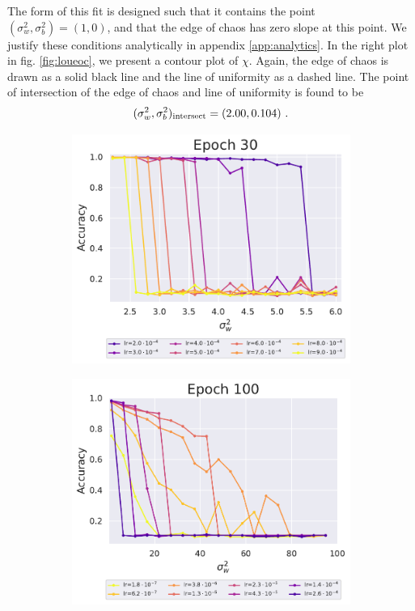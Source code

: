 The form of this fit is designed such that it contains the point $( \sigma_{w}^{2} , \sigma_{b}^{2} ) = (1,0)$, and that the edge of chaos has zero slope at this point. We justify these conditions analytically in appendix \ref{app:analytics}. In the right plot in fig. \ref{fig:loueoc}, we present a contour plot of $\chi$. Again, the edge of chaos is drawn as a solid black line and the line of uniformity as a dashed line. The point of intersection of the edge of chaos and line of uniformity is found to be
%
\begin{equation} \label{eq:intersect}
	( \sigma_{w}^{2} , \sigma_{b}^{2} )_{{\rm intersect}} = (2.00, 0.104)~.
\end{equation}
%

\begin{figure}[t!]
	\centering
	\begin{subfigure}[t]{0.5\textwidth}
		\centering
		\includegraphics[width=\textwidth]{figures/chapter4/dropOff30EpochSmallerRange.pdf}
	\end{subfigure}%
	\begin{subfigure}[t]{0.5\textwidth}
		\centering
		\includegraphics[width=\textwidth]{figures/chapter4/dropOff100Epoch.pdf}

\end{subfigure}
\end{figure}
